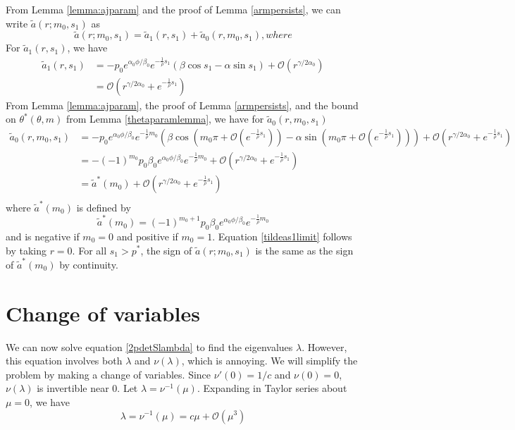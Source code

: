 \documentclass[thesis.tex]{subfiles}
\begin{document}
From Lemma \ref{lemma:ajparam} and the proof of Lemma \ref{armpersists}, we can write $\tilde{a}(r; m_0, s_1)$ as 
\[
\tilde{a}(r; m_0, s_1) = \tilde{a}_1(r, s_1) + \tilde{a}_0(r, m_0, s_1), where
\]
For $\tilde{a}_1(r, s_1)$, we have 
\begin{align*}
\tilde{a}_1(r, s_1) &= -p_0 e^{\alpha_0 \phi/\beta_0} e^{-\frac{1}{\rho}s_1} \left( \beta \cos s_1 - \alpha \sin s_1 \right) + \mathcal{O}(r^{\gamma/2\alpha_0}) \\
&= \mathcal{O}\left(r^{\gamma/2\alpha_0} + e^{-\frac{1}{\rho}s_1} \right)
\end{align*}
From Lemma \ref{lemma:ajparam}, the proof of Lemma \ref{armpersists}, and the bound on $\theta^*(\theta, m)$ from Lemma \ref{thetaparamlemma}, we have for $\tilde{a}_0(r, m_0, s_1)$
\begin{align*}
\tilde{a}_0(r, m_0, s_1) &= -p_0 e^{\alpha_0 \phi/\beta_0} e^{-\frac{1}{\rho}m_0} \left( \beta \cos\left(m_0 \pi + \mathcal{O}\left(e^{-\frac{1}{\rho}s_1} \right) \right) - \alpha \sin \left(m_0 \pi + \mathcal{O}\left(e^{-\frac{1}{\rho}s_1} \right) \right) \right) + \mathcal{O}\left(r^{\gamma/2\alpha_0} + e^{-\frac{1}{\rho}s_1} \right) \\
&= -(-1)^{m_0} p_0 \beta_0 e^{\alpha_0 \phi/\beta_0} e^{-\frac{1}{\rho}m_0} + \mathcal{O}\left(r^{\gamma/2\alpha_0} + e^{-\frac{1}{\rho}s_1} \right) \\
&= \tilde{a}^*(m_0) + \mathcal{O}\left(r^{\gamma/2\alpha_0} + e^{-\frac{1}{\rho}s_1} \right) \\
\end{align*}
where $\tilde{a}^*(m_0)$ is defined by
\[
\tilde{a}^*(m_0) = (-1)^{m_0 + 1} p_0 \beta_0 e^{\alpha_0 \phi/\beta_0} e^{-\frac{1}{\rho}m_0}
\]
and is negative if $m_0 = 0$ and positive if $m_0 = 1$. Equation \cref{tildeas1limit} follows by taking $r = 0$. For all $s_1 > p^*$, the sign of $\tilde{a}(r; m_0, s_1)$ is the same as the sign of $\tilde{a}^*(m_0)$ by continuity.

\section{Change of variables}

We can now solve equation \cref{2pdetSlambda} to find the eigenvalues $\lambda$. However, this equation involves both $\lambda$ and $\nu(\lambda)$, which is annoying. We will simplify the problem by making a change of variables. Since $\nu'(0) = 1/c$ and $\nu(0) = 0$, $\nu(\lambda)$ is invertible near 0. Let $\lambda = \nu^{-1}(\mu)$. Expanding in Taylor series about $\mu = 0$, we have
\begin{equation}\label{2plambdamu}
\lambda = \nu^{-1}(\mu) = c \mu + \mathcal{O}(\mu^3)
\end{equation}
\end{document}
